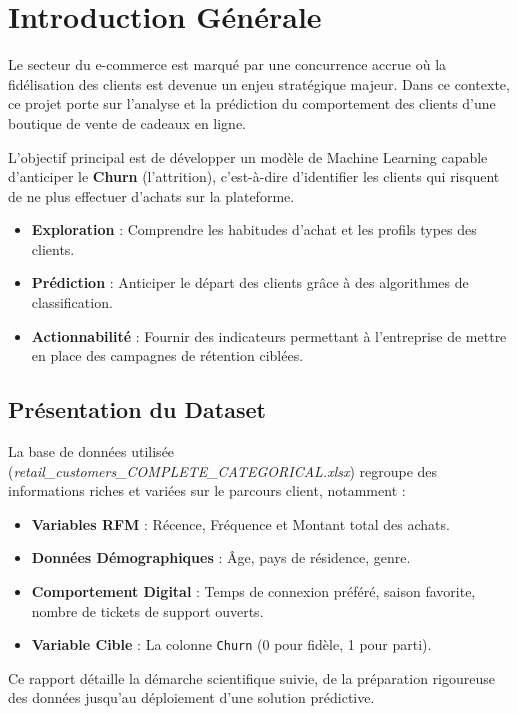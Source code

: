 \section*{Introduction Générale} 

Le secteur du e-commerce est marqué par une concurrence accrue où la fidélisation des clients est devenue un enjeu stratégique majeur. Dans ce contexte, ce projet porte sur l'analyse et la prédiction du comportement des clients d'une boutique de vente de cadeaux en ligne.

L'objectif principal est de développer un modèle de Machine Learning capable d'anticiper le \textbf{Churn} (l'attrition), c'est-à-dire d'identifier les clients qui risquent de ne plus effectuer d'achats sur la plateforme.

\begin{tcolorbox}[title=Objectifs du Projet]
	\begin{itemize}
		\item \textbf{Exploration} : Comprendre les habitudes d'achat et les profils types des clients.
		\item \textbf{Prédiction} : Anticiper le départ des clients grâce à des algorithmes de classification.
		\item \textbf{Actionnabilité} : Fournir des indicateurs permettant à l'entreprise de mettre en place des campagnes de rétention ciblées.
	\end{itemize}
\end{tcolorbox}

\subsection*{Présentation du Dataset}

La base de données utilisée (\textit{retail\_customers\_COMPLETE\_CATEGORICAL.xlsx}) regroupe des informations riches et variées sur le parcours client, notamment :
\begin{itemize}
	\item \textbf{Variables RFM} : Récence, Fréquence et Montant total des achats.
	\item \textbf{Données Démographiques} : Âge, pays de résidence, genre.
	\item \textbf{Comportement Digital} : Temps de connexion préféré, saison favorite, nombre de tickets de support ouverts.
	\item \textbf{Variable Cible} : La colonne \texttt{Churn} (0 pour fidèle, 1 pour parti).
\end{itemize}

Ce rapport détaille la démarche scientifique suivie, de la préparation rigoureuse des données jusqu'au déploiement d'une solution prédictive.
